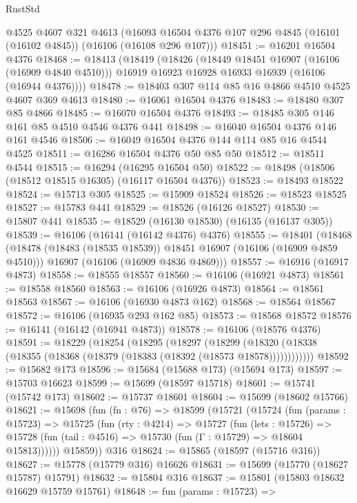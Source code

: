 \begin{lexlean}{RustStd}
\begin{coremodule}
    @4525
    @4607
    @321
    @4613
    (@16093 @16504 @4376 @107 @296 @4845 (@16101 (@16102 @4845)) (@16106 (@16108 @296 @107)))
@18451 := @16201 @16504 @4376
@18468 := @18413
    (@18419
      (@18426
        (@18449 @18451 @16907 (@16106 (@16909 @4840 @4510)))
        @16919
        @16923
        @16928
        @16933
        @16939
        (@16106 (@16944 @4376))))
@18478 := @18403 @307 @114 @85 @16 @4866 @4510 @4525 @4607 @369 @4613
@18480 := @16061 @16504 @4376
@18483 := @18480 @307 @85 @4866
@18485 := @16070 @16504 @4376
@18493 := @18485 @305 @146 @161 @85 @4510 @4546 @4376 @441
@18498 := @16040 @16504 @4376 @146 @161 @4546
@18506 := @16049 @16504 @4376 @144 @114 @85 @16 @4544 @4525
@18511 := @16286 @16504 @4376 @50 @85 @50
@18512 := @18511 @4544
@18515 := @16294 (@16295 @16504 @50)
@18522 := @18498 (@18506 (@18512 @18515 @16305) (@16117 @16504 @4376))
@18523 := @18493 @18522
@18524 := @15713 @305
@18525 := @15909 @18524
@18526 := @18523 @18525
@18527 := @15783 @441
@18529 := @18526 (@16126 @18527)
@18530 := @15807 @441
@18535 := @18529 (@16130 @18530) (@16135 (@16137 @305))
@18539 := @16106 (@16141 (@16142 @4376) @4376)
@18555 := @18401
    (@18468
      (@18478 (@18483 (@18535 @18539)) @18451 @16907 (@16106 (@16909 @4859 @4510)))
      @16907
      (@16106 (@16909 @4836 @4869)))
@18557 := @16916 (@16917 @4873)
@18558 := @18555 @18557
@18560 := @16106 (@16921 @4873)
@18561 := @18558 @18560
@18563 := @16106 (@16926 @4873)
@18564 := @18561 @18563
@18567 := @16106 (@16930 @4873 @162)
@18568 := @18564 @18567
@18572 := @16106 (@16935 @293 @162 @85)
@18573 := @18568 @18572
@18576 := @16141 (@16142 (@16941 @4873))
@18578 := @16106 (@18576 @4376)
@18591 := @18229
    (@18254
      (@18295
        (@18297
          (@18299 (@18320 (@18338 (@18355 (@18368 (@18379 (@18383 (@18392 (@18573 @18578))))))))))))
@18592 := @15682 @173
@18596 := @15684 (@15688 @173) (@15694 @173)
@18597 := @15703 @16623
@18599 := @15699 (@18597 @15718)
@18601 := @15741 (@15742 @173)
@18602 := @15737 @18601
@18604 := @15699 (@18602 @15766)
@18621 := @15698
    (fun (fn : @76) =>
    @18599
      (@15721
        (@15724
          (fun (params : @15723) =>
          @15725
            (fun (rty : @4214) =>
            @15727
              (fun (lets : @15726) =>
              @15728 (fun (tail : @4516) => @15730 (fun (Γ : @15729) => @18604 @15813))))))
        @15859))
    @316
@18624 := @15865 (@18597 (@15716 @316))
@18627 := @15778 (@15779 @316) @16626
@18631 := @15699 (@15770 (@18627 @15787) @15791)
@18632 := @15804 @316
@18637 := @15801 (@15803 @18632 @16629 @15759 @15761)
@18648 := fun (params : @15723) =>

\end{coremodule}
\end{lexlean}
